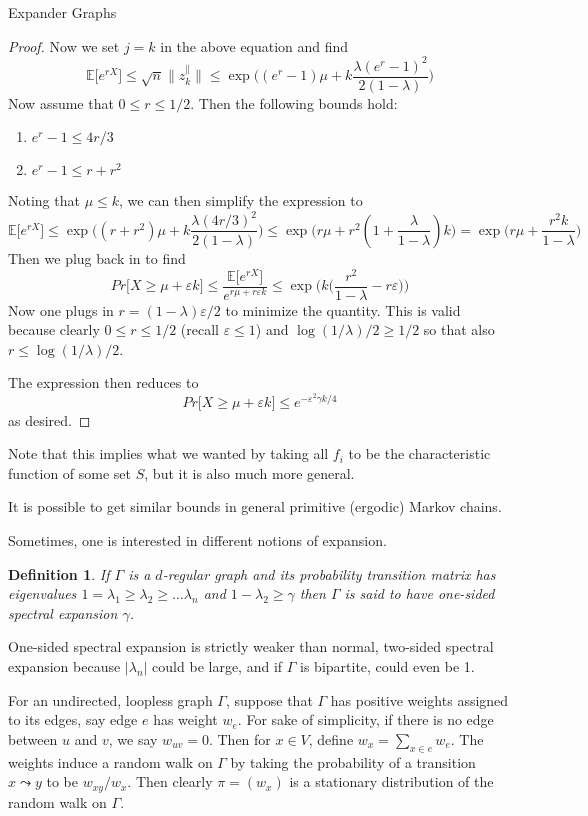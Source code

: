 \documentclass{article}
\newcommand{\E}{\mathbb E}
\newcommand{\eps}{\varepsilon}
\newtheorem{defn}{Definition}
\begin{document}
\begin{section}{Expander Graphs}
\begin{proof}
    Now we set $j = k$ in the above equation and find
    $$
    \E\big[e^{rX}\big] \leq \sqrt{n}\lVert z_k^\parallel\rVert \leq \exp\bigg((e^r-1)\mu + k\frac{\lambda(e^r-1)^2}{2(1-\lambda)}\bigg)
    $$
    Now assume that $0 \leq r \leq 1/2$.
    Then the following bounds hold:
    \begin{enumerate}
      \item
	$e^r - 1 \leq 4r/3$
      \item
	$e^r - 1 \leq r + r^2$
    \end{enumerate}
    Noting that $\mu \leq k$, we can then simplify the expression to
    $$
    \E\big[e^{rX}\big] \leq \exp\bigg((r+r^2)\mu + k\frac{\lambda(4r/3)^2}{2(1-\lambda)}\bigg) \leq \exp\big(r\mu + r^2(1+\frac{\lambda}{1-\lambda})k\big) = \exp\big(r\mu + \frac{r^2k}{1-\lambda}\big)
    $$
    Then we plug back in to find
    $$
    Pr\big[X \geq \mu + \eps k\big] \leq \frac{\E\big[e^{rX}\big]}{e^{r\mu + r\eps k}} \leq \exp\bigg(k\big(\frac{r^2}{1-\lambda} - r\eps\big)\bigg)
    $$
    Now one plugs in $r = (1-\lambda)\eps / 2$ to minimize the quantity.
    This is valid because clearly $0 \leq r \leq 1/2$ (recall $\eps \leq 1$) and $\log(1/\lambda)/2 \geq 1/2$ so that also $r \leq \log(1/\lambda)/2$.

    The expression then reduces to
    $$
    Pr\big[X \geq \mu + \eps k\big] \leq e^{-\eps^2\gamma k/4}
    $$
    as desired.
  \end{proof}
  Note that this implies what we wanted by taking all $f_i$ to be the characteristic function of some set $S$, but it is also much more general.

  It is possible to get similar bounds in general primitive (ergodic) Markov chains.

   Sometimes, one is interested in different notions of expansion.

   \begin{defn}
     If $\Gamma$ is a $d$-regular graph and its probability transition matrix has eigenvalues $1 = \lambda_1 \geq \lambda_2 \geq \ldots \lambda_n$ and $1-\lambda_2 \geq \gamma$ then $\Gamma$ is said to have one-sided spectral expansion $\gamma$.
   \end{defn}

   One-sided spectral expansion is strictly weaker than normal, two-sided spectral expansion because $|\lambda_n|$ could be large, and if $\Gamma$ is bipartite, could even be 1.

    For an undirected, loopless graph $\Gamma$, suppose that $\Gamma$ has positive weights assigned to its edges, say edge $e$ has weight $w_e$.
    For sake of simplicity, if there is no edge between $u$ and $v$, we say $w_{uv} = 0$.
   Then for $x \in V$, define $w_x = \sum_{x \in e}w_e$.
   The weights induce a random walk on $\Gamma$ by taking the probability of a transition $x \leadsto y$ to be $w_{xy}/w_x$.
   Then clearly $\pi = (w_x)$ is a stationary distribution of the random walk on $\Gamma$.


\end{section}
\end{document}
